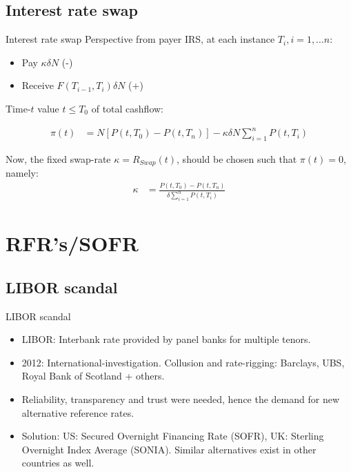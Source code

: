\documentclass[UKenglish]{beamer}
\begin{document}
\subsection{Interest rate swap}

\begin{frame}{Interest rate swap}
Perspective from payer IRS, at each instance $T_{i} , i = 1, \dots n$: 
\begin{itemize}
    \item Pay $\kappa \delta N$ (-)
    \item Receive $F(T_{i-1}, T_{i})\delta N$ (+)
\end{itemize}

Time-$t$ value $t\leq T_{0}$ of total cashflow: 

\begin{align*}
\pi(t) &= N[P(t,T_{0})- P(t,T_{n})] - \kappa \delta N \sum_{i=1}^{n}P(t,T_{i})     
\end{align*}

Now, the fixed swap-rate $\kappa = R_{Swap}(t)$, should be chosen such that $\pi(t) = 0$, namely: 
\begin{align*}
\kappa &= \frac{
P(t,T_{0}) - P(t,T_{n})
}{
\delta \sum_{i=1}^{n}P(t,T_{i})
}    
\end{align*}

\end{frame}


\section{RFR's/SOFR}

\subsection{LIBOR scandal}
\begin{frame}{LIBOR scandal}
\begin{itemize}
    \item LIBOR: Interbank rate provided by panel banks for multiple tenors. 
    \item 2012: International-investigation. Collusion and rate-rigging: Barclays, UBS, Royal Bank of Scotland + others. 
    \item Reliability, transparency and trust were needed, hence the demand for new alternative reference rates.
    \item Solution: US: Secured Overnight Financing Rate (SOFR), UK: Sterling Overnight Index Average (SONIA). Similar alternatives exist in other countries as well.  
\end{itemize}
\end{frame}
\end{document}
